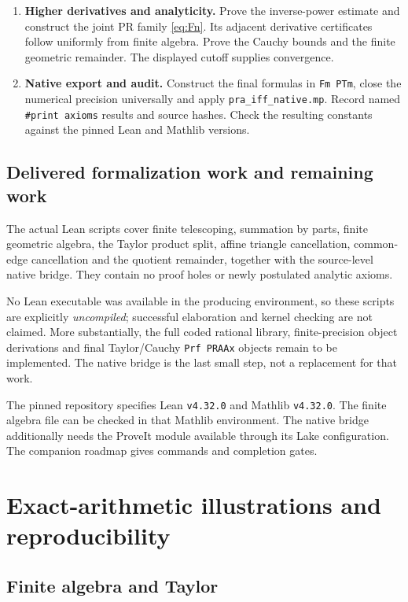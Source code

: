 \documentclass[11pt]{article}
\theoremstyle{definition}
\newcommand{\code}[1]{\texttt{#1}}
\begin{document}
\begin{enumerate}[leftmargin=*]
 \item \textbf{Higher derivatives and analyticity.}
 Prove the inverse-power estimate and construct the joint PR family
 \eqref{eq:Fn}. Its adjacent derivative certificates follow uniformly
 from finite algebra. Prove the Cauchy bounds and the finite geometric
 remainder. The displayed cutoff supplies convergence.

 \item \textbf{Native export and audit.}
 Construct the final formulas in \code{Fm PTm}, close the numerical
 precision universally and apply \code{pra\_iff\_native.mp}.
 Record named \code{\#print axioms} results and source hashes. Check the
 resulting constants against the pinned Lean and Mathlib versions.
\end{enumerate}

\subsection{Delivered formalization work and remaining work}

The actual Lean scripts cover finite telescoping, summation by parts,
finite geometric algebra, the Taylor product split, affine triangle
cancellation, common-edge cancellation and the quotient remainder,
together with the source-level native bridge.
They contain no proof holes or newly postulated analytic axioms.

No Lean executable was available in the producing environment, so these
scripts are explicitly \emph{uncompiled}; successful elaboration and
kernel checking are not claimed. More substantially, the full coded
rational library, finite-precision object derivations and final
Taylor/Cauchy \code{Prf PRAAx} objects remain to be implemented.
The native bridge is the last small step, not a replacement for that work.

The pinned repository specifies Lean \code{v4.32.0} and Mathlib
\code{v4.32.0}. The finite algebra file can be checked in that Mathlib
environment. The native bridge additionally needs the ProveIt module
available through its Lake configuration. The companion roadmap gives
commands and completion gates.

\section{Exact-arithmetic illustrations and reproducibility}\label{sec:validation}

\subsection{Finite algebra and Taylor}
\end{document}
